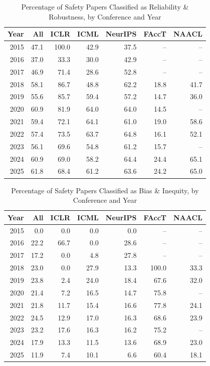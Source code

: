 \begin{table}[ht]
\centering
\caption{Percentage of Safety Papers Classified as Reliability \& Robustness, by Conference and Year} 
\label{tab:summary_reliability_safety}
\begin{tabular}{rrrrrrr}
  \hline
Year & All & ICLR & ICML & NeurIPS & FAccT & NAACL \\ 
  \hline
2015 & 47.1 & 100.0 & 42.9 & 37.5 & -- & -- \\ 
  2016 & 37.0 & 33.3 & 30.0 & 42.9 & -- & -- \\ 
  2017 & 46.9 & 71.4 & 28.6 & 52.8 & -- & -- \\ 
  2018 & 58.1 & 86.7 & 48.8 & 62.2 & 18.8 & 41.7 \\ 
  2019 & 55.6 & 85.7 & 59.4 & 57.2 & 14.7 & 36.0 \\ 
  2020 & 60.9 & 81.9 & 64.0 & 64.0 & 14.5 & -- \\ 
  2021 & 59.4 & 72.1 & 64.1 & 61.0 & 19.0 & 58.6 \\ 
  2022 & 57.4 & 73.5 & 63.7 & 64.8 & 16.1 & 52.1 \\ 
  2023 & 56.1 & 69.6 & 54.8 & 61.2 & 15.7 & -- \\ 
  2024 & 60.9 & 69.0 & 58.2 & 64.4 & 24.4 & 65.1 \\ 
  2025 & 61.8 & 68.4 & 61.2 & 63.6 & 24.2 & 65.0 \\ 
   \hline
\end{tabular}
\end{table}
\begin{table}[ht]
\centering
\caption{Percentage of Safety Papers Classified as Bias \& Inequity, by Conference and Year} 
\label{tab:summary_bias_inequity}
\begin{tabular}{rrrrrrr}
  \hline
Year & All & ICLR & ICML & NeurIPS & FAccT & NAACL \\ 
  \hline
2015 & 0.0 & 0.0 & 0.0 & 0.0 & -- & -- \\ 
  2016 & 22.2 & 66.7 & 0.0 & 28.6 & -- & -- \\ 
  2017 & 17.2 & 0.0 & 4.8 & 27.8 & -- & -- \\ 
  2018 & 23.0 & 0.0 & 27.9 & 13.3 & 100.0 & 33.3 \\ 
  2019 & 23.8 & 2.4 & 24.0 & 18.4 & 67.6 & 32.0 \\ 
  2020 & 21.4 & 7.2 & 16.5 & 14.7 & 75.8 & -- \\ 
  2021 & 21.8 & 11.7 & 15.4 & 16.6 & 77.8 & 24.1 \\ 
  2022 & 24.5 & 12.9 & 17.0 & 16.3 & 68.6 & 23.9 \\ 
  2023 & 23.2 & 17.6 & 16.3 & 16.2 & 75.2 & -- \\ 
  2024 & 17.9 & 13.3 & 11.5 & 13.6 & 68.9 & 23.0 \\ 
  2025 & 11.9 & 7.4 & 10.1 & 6.6 & 60.4 & 18.1 \\ 
   \hline
\end{tabular}
\end{table}
